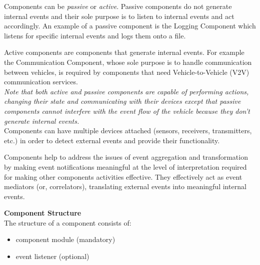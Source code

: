 \documentclass{memoir}
\begin{document}
Components can be \textit{passive} or \textit{active}. Passive components do not generate internal events and their sole purpose is to listen to internal events and act accordingly. An example of a passive component is the Logging Component which listens for specific internal events and logs them onto a file.

Active components are components that generate internal events. For example the Communication Component, whose sole purpose is to handle communication between vehicles, is required by components that need Vehicle-to-Vehicle (V2V) communication services.
\\

\textit{Note that both active and passive components are capable of performing actions, changing their state and communicating with their devices except that passive components cannot interfere with the event flow of the vehicle because they don't generate internal events.}
\\

Components can have multiple devices attached (sensors, receivers, transmitters, etc.) in order to detect external events and provide their functionality.

Components help to address the issues of event aggregation and transformation by making event notifications meaningful at the level of interpretation required for making other components activities effective. They effectively act as event mediators (or, correlators), translating external events into meaningful internal events.


\textbf{Component Structure}
\\
\newline
The structure of a component consists of: 
\begin{itemize}
	\item component module (mandatory)
	\item event listener (optional)
\end{itemize}
\end{document}
